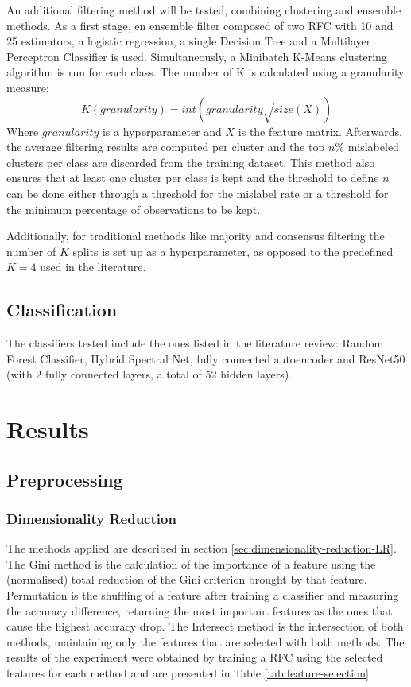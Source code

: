 \documentclass[12pt, english, openany]{book}
\begin{document}
An additional filtering method will be tested, combining clustering and
ensemble methods. As a first stage, en ensemble filter composed of two RFC with
10 and 25 estimators, a logistic regression, a single Decision Tree and a
Multilayer Perceptron Classifier is used. Simultaneously, a Minibatch K-Means
clustering algorithm is run for each class. The number of K is calculated using
a granularity measure:
\begin{equation} \label{eq:k-granularity-formula}
  K(granularity) = int(granularity\sqrt{size(X)})
\end{equation}
Where $granularity$ is a hyperparameter and $X$ is the feature matrix.
Afterwards, the average filtering results are computed per cluster and the top
$n$\% mislabeled clusters per class are discarded from the training dataset.
This method also ensures that at least one cluster per class is kept and the
threshold to define $n$ can be done either through a threshold for the mislabel
rate or a threshold for the minimum percentage of observations to be kept.

Additionally, for traditional methods like majority and consensus filtering the
number of $K$ splits is set up as a hyperparameter, as opposed to the
predefined $K=4$ used in the literature.

\section{Classification}

The classifiers tested include the ones listed in the literature review: Random
Forest Classifier, Hybrid Spectral Net, fully connected autoencoder and
ResNet50 (with 2 fully connected layers, a total of 52 hidden layers).

\chapter{Results}

\section{Preprocessing}

\subsection{Dimensionality Reduction}

The methods applied are described in section
\ref{sec:dimensionality-reduction-LR}. The Gini method is the calculation of
the importance of a feature using the (normalised) total reduction of the Gini
criterion brought by that feature. Permutation is the shuffling of a feature
after training a classifier and measuring the accuracy difference, returning
the most important features as the ones that cause the highest accuracy drop.
The Intersect method is the intersection of both methods, maintaining only the
features that are selected with both methods. The results of the experiment
were obtained by training a RFC using the selected features for each method and
are presented in Table \ref{tab:feature-selection}.
\end{document}
